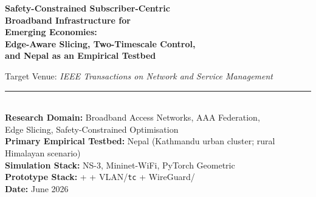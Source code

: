 \begin{titlepage}
  \centering
  \vspace*{2cm}
  {\Large\bfseries\color{deepblue}
    Safety-Constrained Subscriber-Centric\\[6pt]
    Broadband Infrastructure for\\[6pt]
    Emerging Economies:\\[10pt]
    Edge-Aware Slicing, Two-Timescale Control,\\[6pt]
    and Nepal as an Empirical Testbed\par}
  \vspace{1.3cm}
 
  {\normalsize Target Venue: \textit{IEEE Transactions on Network and Service Management}\par}
  \vspace{1cm}
  \rule{0.78\linewidth}{0.5pt}\\[0.4cm]
  {\small
    \textbf{Research Domain:} Broadband Access Networks, AAA Federation,\\
    Edge Slicing, Safety-Constrained Optimisation\\[4pt]
    \textbf{Primary Empirical Testbed:} Nepal (Kathmandu urban cluster; rural Himalayan scenario)\\[4pt]
    \textbf{Simulation Stack:} NS-3, Mininet-WiFi, PyTorch Geometric\\[4pt]
    \textbf{Prototype Stack:} \openWrt{} + \freeradius{} + VLAN/\texttt{tc} + WireGuard/\vxlan{}\\[4pt]
    \textbf{Date:} June 2026
  }

\end{titlepage}
